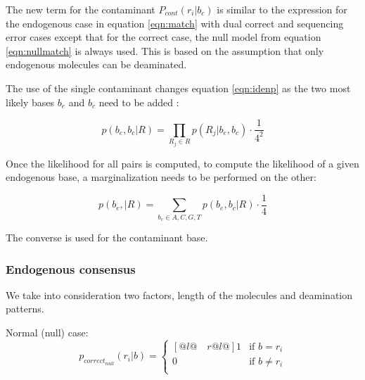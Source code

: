 \documentclass[a4paper,12pt]{article}
\begin{document}
\noindent The new term for the contaminant $P_{cont} (r_i|b_c)$ is similar to the expression for the endogenous case in equation \ref{eqn:match} with dual correct and sequencing error cases except that for the correct case, the null model from equation \ref{eqn:nullmatch} is always used. This is based on the assumption that only endogenous molecules can be deaminated. 

The use of the single contaminant changes equation \ref{eqn:idenp} as the two most likely bases $b_e$ and $b_c$ need to be added :

\begin{equation}
  p(b_e,b_c|R)   = \prod_{R_j \in R} p(R_j|b_e,b_c) \cdot \frac {1} {4^2} 
\end{equation} 

\noindent Once the likelihood for all pairs is computed, to compute the likelihood of a given endogenous base, a marginalization needs to be performed on the other: 

\begin{equation}
  p(b_e,|R)   = \sum_{b_c \in {A,C,G,T}} p(b_e,b_c|R) \cdot \frac {1} {4} 
\end{equation} 

\noindent The converse is used for the contaminant base. 





\subsubsection{Endogenous consensus}
\label{priorendo}
We take into consideration two factors, length of the molecules and deamination patterns.




\noindent  Normal (null) case:
\begin{equation}
  p_{correct_{null}}(r_i|b)   = \begin{cases}[@{}l@{\quad}r@{}l@{}]
    1  &  \text{if }  b = r_i    \\
    0 &  \text{if }  b \ne r_i    \\
  \end{cases}
\end{equation} 
\end{document}
